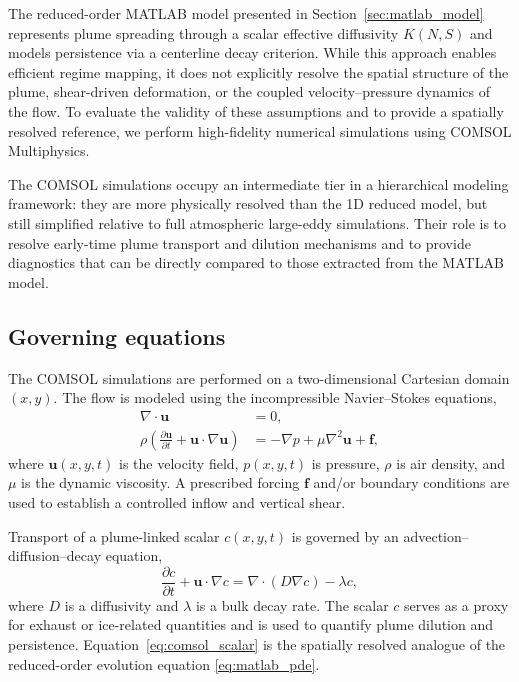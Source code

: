 \documentclass[11pt]{article}
\begin{document}
The reduced-order MATLAB model presented in Section~\ref{sec:matlab_model} represents
plume spreading through a scalar effective diffusivity $K(N,S)$ and models persistence
via a centerline decay criterion. While this approach enables efficient regime mapping,
it does not explicitly resolve the spatial structure of the plume, shear-driven
deformation, or the coupled velocity--pressure dynamics of the flow. To evaluate the
validity of these assumptions and to provide a spatially resolved reference, we perform
high-fidelity numerical simulations using COMSOL Multiphysics.

The COMSOL simulations occupy an intermediate tier in a hierarchical modeling framework:
they are more physically resolved than the 1D reduced model, but still simplified
relative to full atmospheric large-eddy simulations. Their role is to resolve early-time
plume transport and dilution mechanisms and to provide diagnostics that can be directly
compared to those extracted from the MATLAB model.

\subsection{Governing equations}
\label{sec:comsol_equations}

The COMSOL simulations are performed on a two-dimensional Cartesian domain $(x,y)$.
The flow is modeled using the incompressible Navier--Stokes equations,
\begin{align}
\nabla \cdot \mathbf{u} &= 0, \label{eq:comsol_continuity} \\
\rho \left(
\frac{\partial \mathbf{u}}{\partial t}
+ \mathbf{u}\cdot\nabla \mathbf{u}
\right)
&= -\nabla p + \mu \nabla^2 \mathbf{u} + \mathbf{f},
\label{eq:comsol_momentum}
\end{align}
where $\mathbf{u}(x,y,t)$ is the velocity field, $p(x,y,t)$ is pressure, $\rho$ is air
density, and $\mu$ is the dynamic viscosity. A prescribed forcing $\mathbf{f}$ and/or
boundary conditions are used to establish a controlled inflow and vertical shear.

Transport of a plume-linked scalar $c(x,y,t)$ is governed by an advection--diffusion--decay
equation,
\begin{equation}
\frac{\partial c}{\partial t}
+ \mathbf{u}\cdot\nabla c
=
\nabla\cdot\left(D\nabla c\right)
- \lambda c,
\label{eq:comsol_scalar}
\end{equation}
where $D$ is a diffusivity and $\lambda$ is a bulk decay rate. The scalar $c$ serves as a
proxy for exhaust or ice-related quantities and is used to quantify plume dilution and
persistence. Equation~\eqref{eq:comsol_scalar} is the spatially resolved analogue of the
reduced-order evolution equation \eqref{eq:matlab_pde}.
\end{document}
